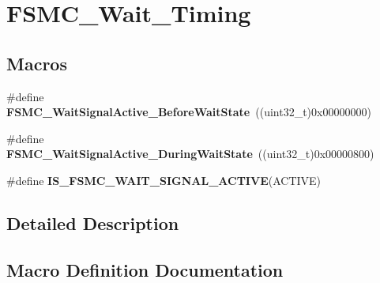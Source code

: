\hypertarget{group___f_s_m_c___wait___timing}{}\section{F\+S\+M\+C\+\_\+\+Wait\+\_\+\+Timing}
\label{group___f_s_m_c___wait___timing}
\subsection*{Macros}
\begin{DoxyCompactItemize}
\item 
\hypertarget{group___f_s_m_c___wait___timing_ga62c6855a7cc65b20024085f09cdc65e8}{}\#define {\bfseries F\+S\+M\+C\+\_\+\+Wait\+Signal\+Active\+\_\+\+Before\+Wait\+State}~((uint32\+\_\+t)0x00000000)\label{group___f_s_m_c___wait___timing_ga62c6855a7cc65b20024085f09cdc65e8}

\item 
\hypertarget{group___f_s_m_c___wait___timing_gae905fc59e5d99091d132d7c221c8b6d4}{}\#define {\bfseries F\+S\+M\+C\+\_\+\+Wait\+Signal\+Active\+\_\+\+During\+Wait\+State}~((uint32\+\_\+t)0x00000800)\label{group___f_s_m_c___wait___timing_gae905fc59e5d99091d132d7c221c8b6d4}

\item 
\#define {\bfseries I\+S\+\_\+\+F\+S\+M\+C\+\_\+\+W\+A\+I\+T\+\_\+\+S\+I\+G\+N\+A\+L\+\_\+\+A\+C\+T\+I\+V\+E}(A\+C\+T\+I\+V\+E)
\end{DoxyCompactItemize}


\subsection{Detailed Description}


\subsection{Macro Definition Documentation}
\hypertarget{group___f_s_m_c___wait___timing_ga3edb40c756afa8bb78550b7e22ded093}{}
